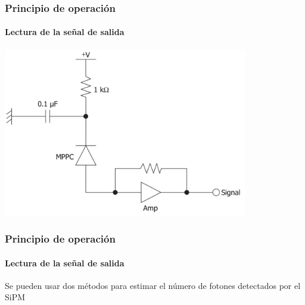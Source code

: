\documentclass{beamer}
\begin{document}
\begin{frame}
\frametitle{Principio de operación}
\framesubtitle{Lectura de la señal de salida}
\includegraphics[width=0.8\textwidth]{d1/readout_sipm}
\end{frame}

\begin{frame}
\frametitle{Principio de operación}
\framesubtitle{Lectura de la señal de salida}
Se pueden usar dos métodos para estimar el número de fotones detectados por el SiPM


\end{frame}
\end{document}
